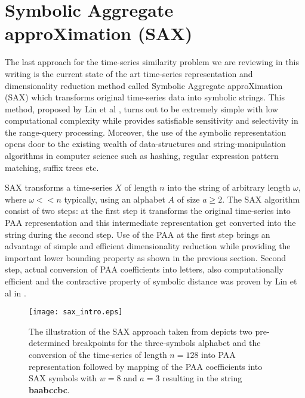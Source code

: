 \section{Symbolic Aggregate approXimation (SAX)}
The last approach for the time-series similarity problem we are reviewing in this writing is the current state of the art time-series representation and dimensionality reduction method called Symbolic Aggregate approXimation (SAX) which transforms original time-series data into symbolic strings. This method, proposed by Lin et al \cite{citeulike:2821475}, turns out to be extremely simple with low computational complexity while provides satisfiable sensitivity and selectivity in the range-query processing. Moreover, the use of the symbolic representation opens door to the existing wealth of data-structures and string-manipulation algorithms in computer science such as hashing, regular expression pattern matching, suffix trees etc.

SAX transforms a time-series $X$ of length $n$ into the string of arbitrary length $\omega$, where $\omega << n$ typically, using an alphabet $A$ of size $ a \geq 2$. The SAX algorithm consist of two steps: at the first step it transforms the original time-series into PAA representation and this intermediate representation get converted into the string during the second step. Use of the PAA at the first step brings an advantage of simple and efficient dimensionality reduction while providing the important lower bounding property as shown in the previous section. Second step, actual conversion of PAA coefficients into letters, also computationally efficient and the contractive property of symbolic distance was proven by Lin et al in \cite{citeulike:532335}.

\begin{figure}[tbp]
   \centering
   \texttt{[image: sax\_intro.eps]}
   \caption{The illustration of the SAX approach taken from \cite{citeulike:2821475} depicts two pre-determined breakpoints for the three-symbols alphabet and the conversion of the time-series of length $n=128$ into PAA representation followed by mapping of the PAA coefficients into SAX symbols with $w=8$ and $a=3$ resulting in the string \textbf{baabccbc}.}
   \label{fig:sax_intro}
\end{figure}

